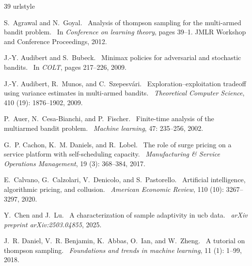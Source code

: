 \documentclass[nonblindrev]{informs3_noinforms}
\def\newblock{\ }%
\begin{document}
\begin{thebibliography}{39}
\providecommand{\natexlab}[1]{#1}
\providecommand{\url}[1]{\texttt{#1}}
\expandafter\ifx\csname urlstyle\endcsname\relax
  \providecommand{\doi}[1]{doi: #1}\else
  \providecommand{\doi}{doi: \begingroup \urlstyle{rm}\Url}\fi

S.~Agrawal and N.~Goyal.
\newblock Analysis of thompson sampling for the multi-armed bandit problem.
\newblock In \emph{Conference on learning theory}, pages 39--1. JMLR Workshop and Conference Proceedings, 2012.

J.-Y. Audibert and S.~Bubeck.
\newblock Minimax policies for adversarial and stochastic bandits.
\newblock In \emph{COLT}, pages 217--226, 2009.

J.-Y. Audibert, R.~Munos, and C.~Szepesv{\'a}ri.
\newblock Exploration--exploitation tradeoff using variance estimates in multi-armed bandits.
\newblock \emph{Theoretical Computer Science}, 410 (19): 1876--1902, 2009.

P.~Auer, N.~Cesa-Bianchi, and P.~Fischer.
\newblock Finite-time analysis of the multiarmed bandit problem.
\newblock \emph{Machine learning}, 47: 235--256, 2002.

G.~P. Cachon, K.~M. Daniels, and R.~Lobel.
\newblock The role of surge pricing on a service platform with self-scheduling capacity.
\newblock \emph{Manufacturing \& Service Operations Management}, 19 (3): 368--384, 2017.

E.~Calvano, G.~Calzolari, V.~Denicolo, and S.~Pastorello.
\newblock Artificial intelligence, algorithmic pricing, and collusion.
\newblock \emph{American Economic Review}, 110 (10): 3267--3297, 2020.

Y.~Chen and J.~Lu.
\newblock A characterization of sample adaptivity in ucb data.
\newblock \emph{arXiv preprint arXiv:2503.04855}, 2025.

J.~R. Daniel, V.~R. Benjamin, K.~Abbas, O.~Ian, and W.~Zheng.
\newblock A tutorial on thompson sampling.
\newblock \emph{Foundations and trends{\textregistered} in machine learning}, 11 (1): 1--99, 2018.


\end{thebibliography}
\end{document}
